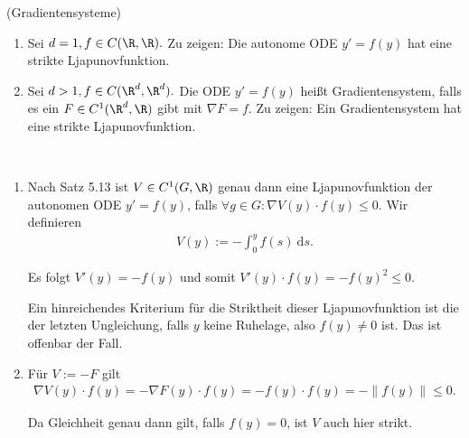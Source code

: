 \begin{exercise} (Gradientensysteme)
\begin{enumerate}[label = \textbf{\alph*)}]
  \item Sei $d = 1, f \in C(\R, \R).$ Zu zeigen: Die autonome ODE $y' = f(y)$ hat eine strikte Ljapunovfunktion.
  \item Sei $d > 1, f \in C(\R^d, \R^d).$ Die ODE $y' = f(y)$ heißt Gradientensystem, falls es ein $F \in C^1(\R^d, \R)$ gibt mit $\nabla F = f$. Zu zeigen: Ein Gradientensystem hat eine strikte Ljapunovfunktion.
\end{enumerate}
\end{exercise}

\begin{solution}
\leavevmode \\
\begin{enumerate}[label = \textbf{\alph*)}]
  \item Nach Satz 5.13 ist $V \in C^1(G, \R)$ genau dann eine Ljapunovfunktion der autonomen ODE $y' = f(y)$, falls $\forall g \in G: \nabla V(y) \cdot f(y) \leq 0$. Wir definieren
  \begin{align}
      V(y) := -\int_0^y f(s)~ \mathrm{d}s.
  \end{align}

  Es folgt $V'(y) = -f(y)$ und somit $V'(y) \cdot f(y) = -f(y)^2 \leq 0.$

  Ein hinreichendes Kriterium für die Striktheit dieser Ljapunovfunktion ist die der letzten Ungleichung, falls $y$ keine Ruhelage, also $f(y) \neq 0$ ist. Das ist offenbar der Fall.
  \item Für $V := -F$ gilt
  \begin{align}
      \nabla V(y) \cdot f(y) = - \nabla F(y) \cdot f(y) = - f(y) \cdot f(y) = - \| f(y) \| \leq 0.
  \end{align}

  Da Gleichheit genau dann gilt, falls $f(y) = 0$, ist $V$ auch hier strikt.
\end{enumerate}
\end{solution}
